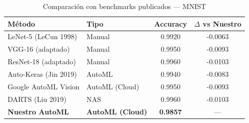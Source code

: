 \begin{table}[htbp]
\centering
\caption{Comparación con benchmarks publicados — MNIST}
\label{tab:benchmark_mnist}
\begin{tabular}{llcc}
\toprule
\textbf{Método} & \textbf{Tipo} & \textbf{Accuracy} & \textbf{$\Delta$ vs Nuestro} \\
\midrule
  LeNet-5 (LeCun 1998) & Manual & 0.9920 & -0.0063 \\
  VGG-16 (adaptado) & Manual & 0.9950 & -0.0093 \\
  ResNet-18 (adaptado) & Manual & 0.9960 & -0.0103 \\
  Auto-Keras (Jin 2019) & AutoML & 0.9940 & -0.0083 \\
  Google AutoML Vision & AutoML (Cloud) & 0.9950 & -0.0093 \\
  DARTS (Liu 2019) & NAS & 0.9960 & -0.0103 \\
\midrule
  \textbf{Nuestro AutoML} & \textbf{AutoML (Cloud)} & \textbf{0.9857} & --- \\
\bottomrule
\end{tabular}
\end{table}